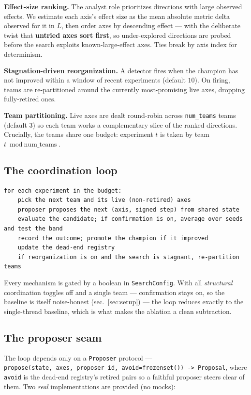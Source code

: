 \documentclass[
]{article}
\begin{document}
\textbf{Effect-size ranking.} The analyst role prioritizes directions
with large observed effects. We estimate each axis's effect size as the
mean absolute metric delta observed for it in \(L\), then order axes by
descending effect --- with the deliberate twist that \textbf{untried
axes sort first}, so under-explored directions are probed before the
search exploits known-large-effect axes. Ties break by axis index for
determinism.

\textbf{Stagnation-driven reorganization.} A detector fires when the
champion has not improved within a window of recent experiments (default
\(10\)). On firing, teams are re-partitioned around the currently
most-promising live axes, dropping fully-retired ones.

\textbf{Team partitioning.} Live axes are dealt round-robin across
\texttt{num\_teams} teams (default \(3\)) so each team works a
complementary slice of the ranked directions. Crucially, the teams share
one budget: experiment \(t\) is taken by team
\(t \bmod \text{num\_teams}\).

\subsection{The coordination loop}\label{the-coordination-loop}

\begin{verbatim}
for each experiment in the budget:
    pick the next team and its live (non-retired) axes
    proposer proposes the next (axis, signed step) from shared state
    evaluate the candidate; if confirmation is on, average over seeds and test the band
    record the outcome; promote the champion if it improved
    update the dead-end registry
    if reorganization is on and the search is stagnant, re-partition teams
\end{verbatim}

Every mechanism is gated by a boolean in \texttt{SearchConfig}. With all
\emph{structural} coordination toggles off and a single team ---
confirmation stays on, so the baseline is itself noise-honest
(sec.~\ref{sec:setup}) --- the loop reduces exactly to the single-thread
baseline, which is what makes the ablation a clean subtraction.

\subsection{The proposer seam}\label{the-proposer-seam}

The loop depends only on a \texttt{Proposer} protocol ---
\texttt{propose(state,\ axes,\ proposer\_id,\ avoid=frozenset())\ -\textgreater{}\ Proposal},
where \texttt{avoid} is the dead-end registry's retired
 pairs so a faithful proposer steers clear of
them. Two \emph{real} implementations are provided (no mocks):
\end{document}
